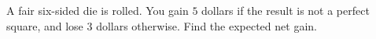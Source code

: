 A fair six-sided die is rolled. You gain $ 5 $ dollars if the result is not a perfect square, and lose $ 3 $ dollars otherwise. Find the expected net gain.
